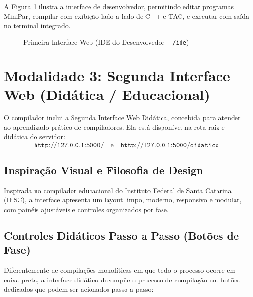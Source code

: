 A Figura \ref{fig:ide_dev} ilustra a interface de desenvolvedor, permitindo editar programas MiniPar, compilar com exibição lado a lado de C++ e TAC, e executar com saída no terminal integrado.

\begin{figure}[htbp]
    \centering
    \caption{Primeira Interface Web (IDE do Desenvolvedor -- \texttt{/ide})}
    \label{fig:ide_dev}
\end{figure}

\section{Modalidade 3: Segunda Interface Web (Didática / Educacional)}

O compilador inclui a Segunda Interface Web Didática, concebida para atender ao aprendizado prático de compiladores. Ela está disponível na rota raiz e didática do servidor:
\[ \texttt{http://127.0.0.1:5000/}\quad\text{e}\quad\texttt{http://127.0.0.1:5000/didatico} \]

\subsection{Inspiração Visual e Filosofia de Design}
Inspirada no compilador educacional do Instituto Federal de Santa Catarina (IFSC), a interface apresenta um layout limpo, moderno, responsivo e modular, com painéis ajustáveis e controles organizados por fase.

\subsection{Controles Didáticos Passo a Passo (Botões de Fase)}
Diferentemente de compilações monolíticas em que todo o processo ocorre em caixa-preta, a interface didática decompõe o processo de compilação em botões dedicados que podem ser acionados passo a passo:

